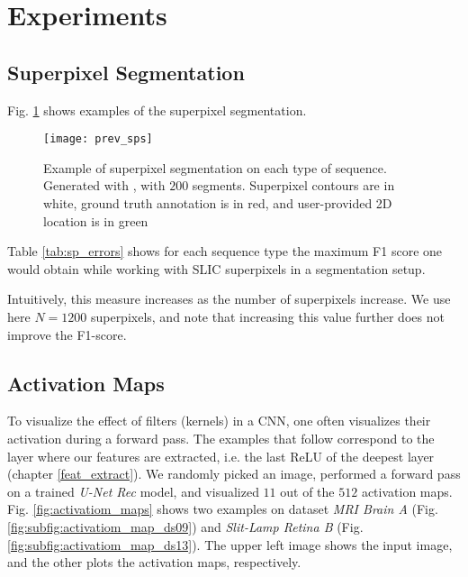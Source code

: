 \section{Experiments}
\label{sec:feats_results}

\subsection{Superpixel Segmentation}
\label{sec:superpix}
Fig. \ref{fig:sp_example} shows examples of the superpixel segmentation.

\begin{figure}[htbp]
  \centering
  \texttt{[image: prev\_sps]}
  \caption[Superpixel segmentation example]{Example of superpixel segmentation on each type of sequence. Generated with \cite{achanta12}, with $200$ segments.
  Superpixel contours are in white, ground truth annotation is in red, and user-provided 2D location is in green}
  \label{fig:sp_example}
\end{figure}

Table \ref{tab:sp_errors} shows for each sequence type the maximum F1 score one would obtain while working with SLIC superpixels in a segmentation setup.

Intuitively, this measure increases as the number of superpixels increase.
We use here $N=1200$ superpixels, and note that increasing this value further does not improve the F1-score.



\subsection{Activation Maps} \label{ch:act_maps}
To visualize the effect of filters (kernels) in a CNN, one often visualizes their activation during a forward pass.
The examples that follow correspond to the layer where our features are extracted, i.e. the last ReLU of the deepest layer (chapter \ref{feat_extract}). We randomly picked an image, performed a forward pass on a trained \textit{U-Net Rec} model, and visualized $11$ out of the $512$ activation maps. Fig. \ref{fig:activatiom_maps} shows two examples on dataset \textit{MRI Brain A} (Fig. \ref{fig:subfig:activatiom_map_ds09}) and \textit{Slit-Lamp Retina B} (Fig. \ref{fig:subfig:activatiom_map_ds13}). The upper left image shows the input image, and the other plots the activation maps, respectively.

